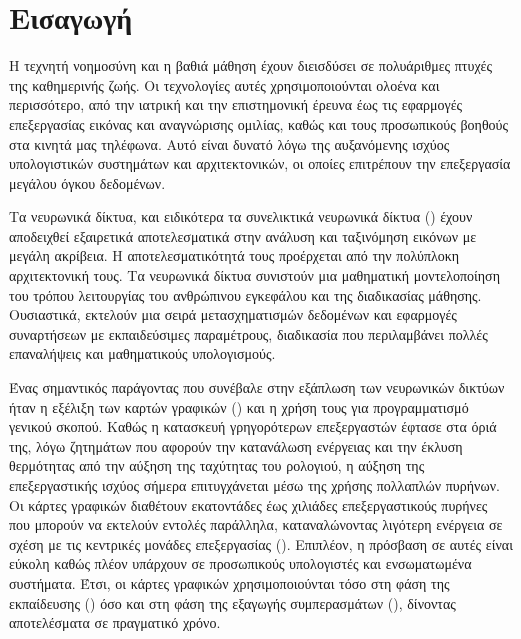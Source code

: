 \chapter{Εισαγωγή} 
Η τεχνητή νοημοσύνη και η βαθιά μάθηση  έχουν διεισδύσει σε πολυάριθμες πτυχές της καθημερινής ζωής. Οι τεχνολογίες αυτές χρησιμοποιούνται ολοένα και περισσότερο, από την ιατρική και την επιστημονική έρευνα έως τις εφαρμογές επεξεργασίας εικόνας και αναγνώρισης ομιλίας, καθώς και τους προσωπικούς βοηθούς στα κινητά μας τηλέφωνα. Αυτό είναι δυνατό λόγω της αυξανόμενης ισχύος υπολογιστικών συστημάτων και αρχιτεκτονικών, οι οποίες επιτρέπουν την επεξεργασία μεγάλου όγκου δεδομένων. 

Τα νευρωνικά δίκτυα, και ειδικότερα τα συνελικτικά νευρωνικά δίκτυα () έχουν αποδειχθεί εξαιρετικά αποτελεσματικά στην ανάλυση και ταξινόμηση εικόνων με μεγάλη ακρίβεια. Η αποτελεσματικότητά τους προέρχεται από την πολύπλοκη αρχιτεκτονική τους. Τα νευρωνικά δίκτυα συνιστούν μια μαθηματική μοντελοποίηση του τρόπου λειτουργίας του ανθρώπινου εγκεφάλου και της διαδικασίας μάθησης. Ουσιαστικά, εκτελούν μια σειρά μετασχηματισμών δεδομένων και εφαρμογές συναρτήσεων με εκπαιδεύσιμες παραμέτρους, διαδικασία που περιλαμβάνει πολλές επαναλήψεις και μαθηματικούς υπολογισμούς. 

Ένας σημαντικός παράγοντας που συνέβαλε στην εξάπλωση των νευρωνικών δικτύων ήταν η εξέλιξη των καρτών γραφικών () και η χρήση τους για προγραμματισμό γενικού σκοπού. Καθώς η κατασκευή γρηγορότερων επεξεργαστών έφτασε στα όριά της, λόγω ζητημάτων που αφορούν την κατανάλωση ενέργειας και την έκλυση θερμότητας από την αύξηση της ταχύτητας του ρολογιού, η αύξηση της επεξεργαστικής ισχύος σήμερα επιτυγχάνεται μέσω της χρήσης πολλαπλών πυρήνων. Οι κάρτες γραφικών διαθέτουν εκατοντάδες έως χιλιάδες επεξεργαστικούς πυρήνες που μπορούν να εκτελούν εντολές παράλληλα, καταναλώνοντας λιγότερη ενέργεια σε σχέση με τις κεντρικές μονάδες επεξεργασίας (). Επιπλέον, η πρόσβαση σε αυτές είναι εύκολη καθώς πλέον υπάρχουν σε προσωπικούς υπολογιστές και ενσωματωμένα συστήματα. Έτσι, οι κάρτες γραφικών χρησιμοποιούνται τόσο στη φάση της εκπαίδευσης () όσο και στη φάση της εξαγωγής συμπερασμάτων (), δίνοντας αποτελέσματα σε πραγματικό χρόνο.


